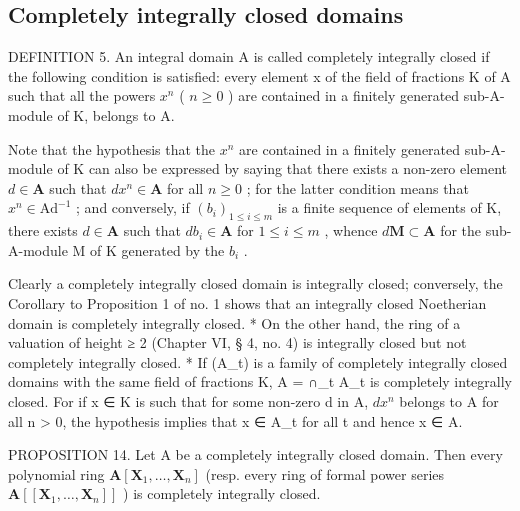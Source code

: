 \subsection{Completely integrally closed domains}

DEFINITION 5. An integral domain A is called completely integrally closed if the following condition is satisfied: every element x of the field of fractions K of A such that all the powers \(x^{n}\) ( \(n \geqslant 0\) ) are contained in a finitely generated sub-A-module of K, belongs to A.

Note that the hypothesis that the \(x^n\) are contained in a finitely generated sub-A-module of K can also be expressed by saying that there exists a non-zero element \(d \in \mathbf{A}\) such that \(dx^n \in \mathbf{A}\) for all \(n \geqslant 0\) ; for the latter condition means that \(x^n \in \mathrm{Ad}^{-1}\) ; and conversely, if \((b_i)_{1 \leqslant i \leqslant m}\) is a finite sequence of elements of K, there exists \(d \in \mathbf{A}\) such that \(db_i \in \mathbf{A}\) for \(1 \leqslant i \leqslant m\) , whence \(d\mathbf{M} \subset \mathbf{A}\) for the sub-A-module M of K generated by the \(b_i\) .

Clearly a completely integrally closed domain is integrally closed; conversely, the Corollary to Proposition 1 of no. 1 shows that an integrally closed Noetherian domain is completely integrally closed. * On the other hand, the ring of a valuation of height ≥ 2 (Chapter VI, § 4, no. 4) is integrally closed but not completely integrally closed. * If (A\_t) is a family of completely integrally closed domains with the same field of fractions K, A = ∩\_t A\_t is completely integrally closed. For if x ∈ K is such that for some non-zero d in A, \(dx^n\) belongs to A for all n \textgreater{} 0, the hypothesis implies that x ∈ A\_t for all t and hence x ∈ A.

PROPOSITION 14. Let A be a completely integrally closed domain. Then every polynomial ring \(\mathbf{A}[\mathbf{X}_1,\ldots ,\mathbf{X}_n]\) (resp. every ring of formal power series \(\mathbf{A}[[\mathbf{X}_1,\dots ,\mathbf{X}_n]]\) ) is completely integrally closed.

